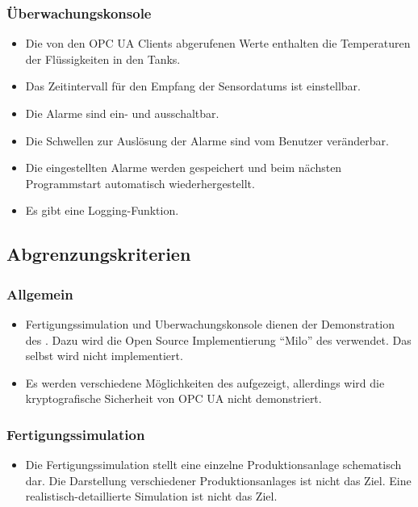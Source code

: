 \documentclass[parskip=full]{scrartcl}
\begin{document}
\subsubsection{Überwachungskonsole}
\begin{itemize}
  \item Die von den \glspl{OPC UA Client} abgerufenen Werte enthalten die Temperaturen der Flüssigkeiten in den Tanks.
  \item Das Zeitintervall für den Empfang der \glspl{Sensordatum} ist einstellbar.
  \item Die Alarme sind ein- und ausschaltbar.
  \item Die Schwellen zur Ausl\"osung der Alarme sind vom Benutzer veränderbar.
  \item Die eingestellten Alarme werden gespeichert und beim n\"achsten Programmstart automatisch wiederhergestellt.
  \item Es gibt eine Logging-Funktion.
\end{itemize}

\subsection{Abgrenzungskriterien}
\subsubsection{Allgemein}
\begin{itemize}
  \item \gls{Fertigungssimulation} und \gls{Uberwachungskonsole} dienen der Demonstration des . Dazu wird die Open Source
    Implementierung "`\gls{Milo}"' des  verwendet. Das  selbst wird nicht implementiert.
  \item Es werden verschiedene Möglichkeiten des  aufgezeigt, allerdings wird die kryptografische Sicherheit von \gls{OPC UA} nicht demonstriert.
\end{itemize}

\subsubsection{Fertigungssimulation}
\begin{itemize}
  \item Die \gls{Fertigungssimulation} stellt eine einzelne \gls{Produktionsanlage} schematisch dar. Die Darstellung verschiedener \glspl{Produktionsanlage}
    ist nicht das Ziel. Eine realistisch-detaillierte Simulation ist nicht das Ziel.
\end{itemize}
\end{document}
